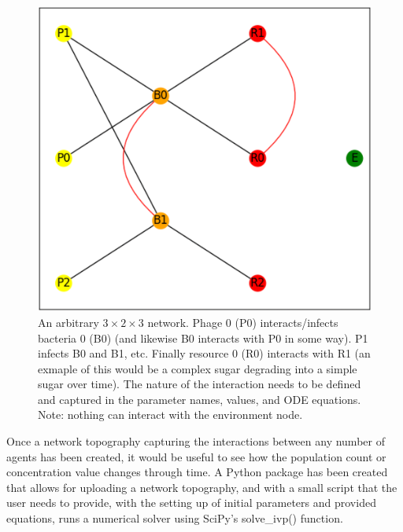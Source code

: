 \begin{figure}
    \centering
    \includegraphics[width=0.5\linewidth]{Chapters/Screenshots/example_network.png}
    \caption{An arbitrary $3\times2\times3$ network. Phage 0 (P0) interacts/infects bacteria 0 (B0) (and likewise B0 interacts with P0 in some way). P1 infects B0 and B1, etc. Finally resource 0 (R0) interacts with R1 (an exmaple of this would be a complex sugar degrading into a simple sugar over time). The nature of the interaction needs to be defined and captured in the parameter names, values, and ODE equations. Note: nothing can interact with the environment node.}
    \label{fig:ss:example_network}
\end{figure}

Once a network topography capturing the interactions between any number of agents has been created, it would be useful to see how the population count or concentration value changes through time. 
A Python package has been created that allows for uploading a network topography, and with a small script that the user needs to provide, with the setting up of initial parameters and provided equations, runs a numerical solver using SciPy's solve\_ivp() function.  